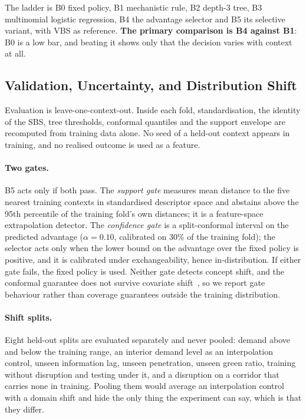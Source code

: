 The ladder is B0 fixed policy, B1 mechanistic rule, B2 depth-3 tree, B3
multinomial logistic regression, B4 the advantage selector and B5 its selective
variant, with VBS as reference. \textbf{The primary comparison is B4 against
B1}: B0 is a low bar, and beating it shows only that the decision varies with
context at all.

\subsection{Validation, Uncertainty, and Distribution Shift}

Evaluation is leave-one-context-out. Inside each fold, standardisation, the
identity of the SBS, tree thresholds, conformal quantiles and the support
envelope are recomputed from training data alone. No seed of a held-out context
appears in training, and no realised outcome is used as a feature.

\paragraph{Two gates.} B5 acts only if both pass. The \emph{support gate}
measures mean distance to the five nearest training contexts in standardised
descriptor space and abstains above the 95th percentile of the training fold's
own distances; it is a feature-space extrapolation detector. The
\emph{confidence gate} is a split-conformal interval on the predicted advantage
($\alpha=0.10$, calibrated on 30\% of the training fold); the selector acts only
when the lower bound on the advantage over the fixed policy is positive, and it
is calibrated under exchangeability, hence in-distribution. If either gate
fails, the fixed policy is used. Neither gate detects concept shift, and the
conformal guarantee does not survive covariate
shift~\cite{shimodaira2000,tibshirani2019covshift}, so we report gate behaviour
rather than coverage guarantees outside the training distribution.

\paragraph{Shift splits.} Eight held-out splits are evaluated separately and
never pooled: demand above and below the training range, an interior demand
level as an interpolation control, unseen information lag, unseen penetration,
unseen green ratio, training without disruption and testing under it, and a
disruption on a corridor that carries none in training. Pooling them would
average an interpolation control with a domain shift and hide the only thing the
experiment can say, which is that they differ.
